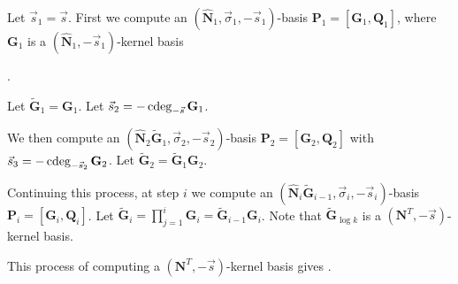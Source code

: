 Let $\vec{s}_{1}=\vec{s}$. First we compute an $\left(\hat{\mathbf{N}}_{1},\vec{\sigma}_{1},-\vec{s}_{1}\right)$-basis
$\mathbf{P}_{1}=\left[\mathbf{G}_{1},\mathbf{Q}_{1}\right]$, where
$\mathbf{G}_{1}$ is a $\left(\hat{\mathbf{N}}_{1},-\vec{s}_{1}\right)$-kernel
basis%
\begin{comment}
 with $\cdeg_{-\vec{s}_{1}}\mathbf{N}_{1}\le0$
\end{comment}
.

Let $\tilde{\mathbf{G}}_{1}=\mathbf{G}_{1}$. Let $\vec{s}_{2}=-\cdeg_{-\vec{s}}\mathbf{G}_{1}$.
\begin{comment}
Note that $-\vec{s}_{1}\le-[\vec{s}_{2},\vec{t}_{2}]\le\left[0,\dots,0,1,\dots1\right]$
component-wise, since $\mathbf{P}_{1}$ has lower order than any $\left(\mathbf{M}^{T},\vec{b}+\left[1,\dots,1\right],-\vec{s}\right)$-basis
$\mathbf{P}$ hence generates $\mathbf{P}$. Therefore, $\cdeg_{-\vec{s}}\mathbf{P}_{1}\le\cdeg_{-\vec{s}}\mathbf{P}\le\left[0,\dots,0,1,\dots1\right]$. 
\end{comment}
{} We then compute an $\left(\hat{\mathbf{N}}_{2}\tilde{\mathbf{G}}_{1},\vec{\sigma}_{2},-\vec{s}_{2}\right)$-basis
$\mathbf{P}_{2}=\left[\mathbf{G}_{2},\mathbf{Q}_{2}\right]$ with
$\vec{s}_{3}=-\cdeg_{-\vec{s}_{2}}\mathbf{G}_{2}$. Let $\tilde{\mathbf{G}}_{2}=\tilde{\mathbf{G}}_{1}\mathbf{G}_{2}$.
\begin{comment}
Let $\mathbf{R}_{1}=\left[\mathbf{N}_{1}\mathbf{Q}_{2},\mathbf{Q}_{1}\right]$
and $\mathbf{R}_{1}^{r}=\revCol\left(\mathbf{R}_{1},-\vec{s},\cdeg_{-\vec{s}}\mathbf{R}_{1}\right)$.
Then from \prettyref{lem:unimodularComputationByRows} we know $\left[\mathbf{F}^{T},\mathbf{R}_{1}^{r}\right]$
is a unimodular matrix.
\end{comment}


Continuing this process, at step $i$ we compute an $\left(\hat{\mathbf{N}}_{i}\tilde{\mathbf{G}}_{i-1},\vec{\sigma}_{i},-\vec{s}_{i}\right)$-basis
$\mathbf{P}_{i}=\left[\mathbf{G}_{i},\mathbf{Q}_{i}\right]$. Let
$\tilde{\mathbf{G}}_{i}=\prod_{j=1}^{i}\mathbf{G}_{i}=\tilde{\mathbf{G}}_{i-1}\mathbf{G}_{i}$.
Note that $\tilde{\mathbf{G}}_{\log k}$ is a $\left(\mathbf{N}^{T},-\vec{s}\right)$-kernel
basis. 

This process of computing a $\left(\mathbf{N}^{T},-\vec{s}\right)$-kernel
basis gives .

